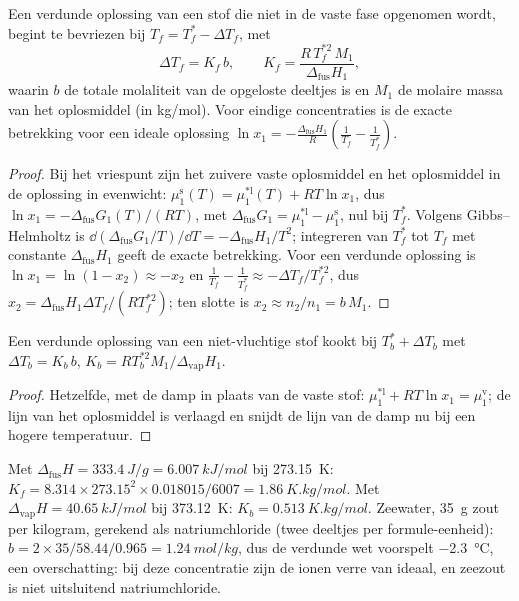 \begin{theorem}[Vriespuntsdaling]\label{thm:b2:chemical-potential:cryoscopy}
Een verdunde oplossing van een stof die niet in de vaste fase opgenomen wordt, begint te bevriezen
bij $T_f = T_f^* - \Delta T_f$, met
\[
  \Delta T_f = K_f\,b, \qquad K_f = \frac{R\,T_f^{*2}\,M_1}{\Delta_{\text{fus}}H_1} ,
\]
waarin $b$ de totale molaliteit van de opgeloste deeltjes is en $M_1$ de molaire
massa van het oplosmiddel (in \unit{kg/mol}). Voor eindige concentraties is de exacte
betrekking voor een ideale oplossing $\ln x_1 = -\frac{\Delta_{\text{fus}}H_1}{R}
\left(\frac{1}{T_f} - \frac{1}{T_f^*}\right)$.
\end{theorem}

\begin{proof}
Bij het vriespunt zijn het zuivere vaste oplosmiddel en het oplosmiddel in de oplossing in
evenwicht: $\mu_1^{\text{s}}(T) = \mu_1^{*\text{l}}(T) + RT\ln x_1$, dus
$\ln x_1 = -\Delta_{\text{fus}}G_1(T)/(RT)$, met $\Delta_{\text{fus}}G_1 =
\mu_1^{*\text{l}} - \mu_1^{\text{s}}$, nul bij $T_f^*$. Volgens Gibbs--Helmholtz is
$\dd(\Delta_{\text{fus}}G_1/T)/\dd T = -\Delta_{\text{fus}}H_1/T^2$;
integreren van $T_f^*$ tot $T_f$ met constante $\Delta_{\text{fus}}H_1$ geeft
de exacte betrekking. Voor een verdunde oplossing is $\ln x_1 = \ln(1 - x_2) \approx
-x_2$ en $\frac1{T_f} - \frac1{T_f^*} \approx -\Delta T_f/T_f^{*2}$, dus
$x_2 = \Delta_{\text{fus}}H_1\Delta T_f/(RT_f^{*2})$; ten slotte is $x_2 \approx
n_2/n_1 = b\,M_1$.
\end{proof}

\begin{proposition}[Kookpuntsverhoging]\label{prop:b2:chemical-potential:ebullioscopy}
Een verdunde oplossing van een niet-vluchtige stof kookt bij $T_b^* + \Delta T_b$ met
$\Delta T_b = K_b\,b$, $K_b = RT_b^{*2}M_1/\Delta_{\text{vap}}H_1$.
\end{proposition}

\begin{proof}
Hetzelfde, met de damp in plaats van de vaste stof: $\mu_1^{*\text{l}} +
RT\ln x_1 = \mu_1^{\text{v}}$; de lijn van het oplosmiddel is verlaagd en snijdt
de lijn van de damp nu bij een hogere temperatuur.
\end{proof}

\begin{example}[Water]\label{ex:b2:chemical-potential:water-constants}
Met $\Delta_{\text{fus}}H = \qty{333.4}{J/g} = \qty{6.007}{kJ/mol}$ bij
\qty{273.15}{K}: $K_f = 8.314 \times 273.15^2 \times 0.018015/6007 =
\qty{1.86}{K.kg/mol}$. Met $\Delta_{\text{vap}}H = \qty{40.65}{kJ/mol}$ bij
\qty{373.12}{K}: $K_b = \qty{0.513}{K.kg/mol}$. Zeewater, \qty{35}{g} zout
per kilogram, gerekend als natriumchloride (twee deeltjes per formule-eenheid):
$b = 2 \times 35/58.44/0.965 = \qty{1.24}{mol/kg}$, dus de verdunde wet
voorspelt \qty{-2.3}{\celsius}, een overschatting: bij deze concentratie zijn de
ionen verre van ideaal, en zeezout is niet uitsluitend natriumchloride.
\end{example}

